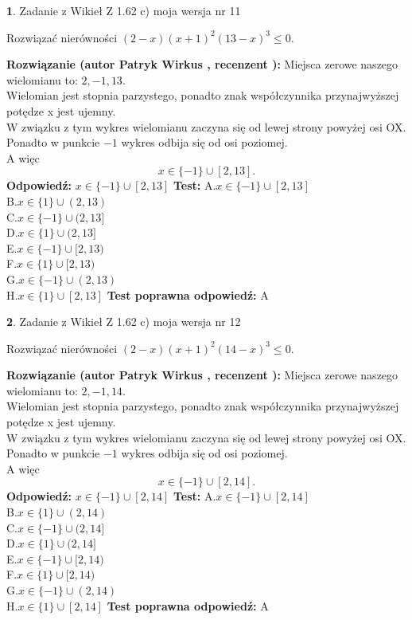 \documentclass[12pt, a4paper]{article}
\theoremstyle{definition} %
\newtheorem{zad}{}
\newcommand{\zadStart}[1]{\begin{zad}#1\newline}
\newcommand{\zadStop}{\end{zad}}
\newcommand{\rozwStart}[2]{\noindent \textbf{Rozwiązanie (autor #1 , recenzent #2): }\newline}
\newcommand{\rozwStop}{\newline}
\newcommand{\odpStart}{\noindent \textbf{Odpowiedź:}\newline}
\newcommand{\odpStop}{\newline}
\newcommand{\testStart}{\noindent \textbf{Test:}\newline}
\newcommand{\testStop}{\newline}
\newcommand{\kluczStart}{\noindent \textbf{Test poprawna odpowiedź:}\newline}
\newcommand{\kluczStop}{\newline}
\begin{document}
\zadStart{Zadanie z Wikieł Z 1.62 c) moja wersja nr 11}

Rozwiązać nierówności $(2-x)(x+1)^{2}(13-x)^{3}\le0$.
\zadStop
\rozwStart{Patryk Wirkus}{}
Miejsca zerowe naszego wielomianu to: $2, -1, 13$.\\
Wielomian jest stopnia parzystego, ponadto znak współczynnika przy\linebreak najwyższej potędze x jest ujemny.\\ W związku z tym wykres wielomianu zaczyna się od lewej strony powyżej osi OX.\\
Ponadto w punkcie $-1$ wykres odbija się od osi poziomej.\\
A więc $$x \in \{-1\} \cup [2,13].$$
\rozwStop
\odpStart
$x \in \{-1\} \cup [2,13]$
\odpStop
\testStart
A.$x \in \{-1\} \cup [2,13]$\\
B.$x \in \{1\} \cup (2,13)$\\
C.$x \in \{-1\} \cup (2,13]$\\
D.$x \in \{1\} \cup (2,13]$\\
E.$x \in \{-1\} \cup [2,13)$\\
F.$x \in \{1\} \cup [2,13)$\\
G.$x \in \{-1\} \cup (2,13)$\\
H.$x \in \{1\} \cup [2,13]$
\testStop
\kluczStart
A
\kluczStop



\zadStart{Zadanie z Wikieł Z 1.62 c) moja wersja nr 12}

Rozwiązać nierówności $(2-x)(x+1)^{2}(14-x)^{3}\le0$.
\zadStop
\rozwStart{Patryk Wirkus}{}
Miejsca zerowe naszego wielomianu to: $2, -1, 14$.\\
Wielomian jest stopnia parzystego, ponadto znak współczynnika przy\linebreak najwyższej potędze x jest ujemny.\\ W związku z tym wykres wielomianu zaczyna się od lewej strony powyżej osi OX.\\
Ponadto w punkcie $-1$ wykres odbija się od osi poziomej.\\
A więc $$x \in \{-1\} \cup [2,14].$$
\rozwStop
\odpStart
$x \in \{-1\} \cup [2,14]$
\odpStop
\testStart
A.$x \in \{-1\} \cup [2,14]$\\
B.$x \in \{1\} \cup (2,14)$\\
C.$x \in \{-1\} \cup (2,14]$\\
D.$x \in \{1\} \cup (2,14]$\\
E.$x \in \{-1\} \cup [2,14)$\\
F.$x \in \{1\} \cup [2,14)$\\
G.$x \in \{-1\} \cup (2,14)$\\
H.$x \in \{1\} \cup [2,14]$
\testStop
\kluczStart
A
\kluczStop
\end{document}
